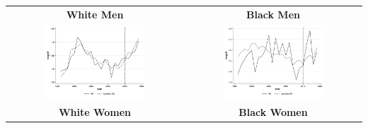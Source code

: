 \documentclass[11pt]{article}
\begin{document}
{\begin{landscape}
\begin{table}[ht!]
\begin{tabular}{c c}
    \end{tabular}
\end{table}
\end{landscape}

\pagebreak
\begin{landscape}
\begin{table}[ht!]
    \centering
    \label{fig:synth_wi}
    \begin{tabular}{c c}
          \textbf{White Men} & \textbf{Black Men} \\    
          \includegraphics[width = 0.6\textwidth, keepaspectratio]{figures/fin_synth_wm_wi.png} & \includegraphics[width = 0.6\textwidth, keepaspectratio]{figures/fin_synth_bm_wi.png} \\
          \textbf{White Women} & \textbf{Black Women} \\

\end{tabular}
\end{table}
\end{landscape}}
\end{document}
